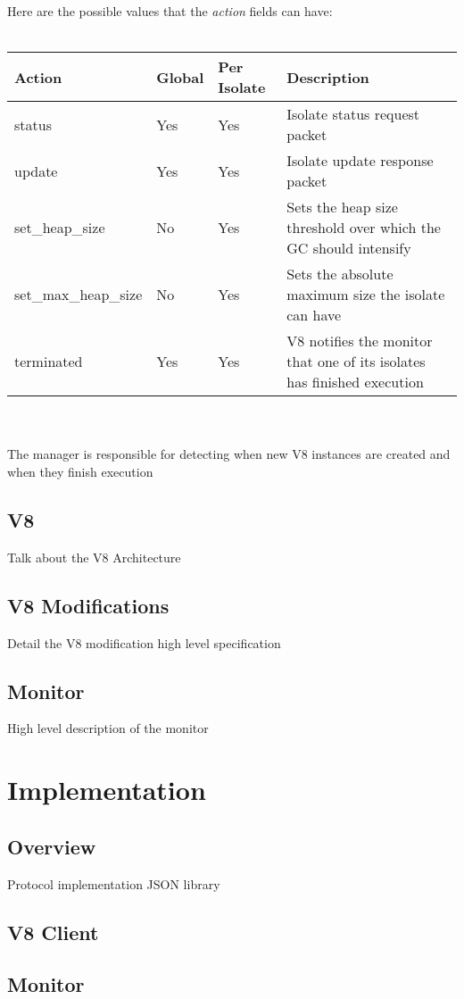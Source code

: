 \documentclass{l4proj}
\begin{document}
Here are the possible values that the \textit{action} fields can have:\\\\
\begin{tabular}{  l  l  l  l  }
  Action & Global & Per Isolate & Description \\
\hline
  status & Yes & Yes & Isolate status request packet\\
  update & Yes & Yes & Isolate update response packet\\
  set\_heap\_size & No & Yes & Sets the heap size threshold over which the GC should intensify\\
  set\_max\_heap\_size & No & Yes & Sets the absolute maximum size the isolate can have\\
  terminated & Yes & Yes & V8 notifies the monitor that one of its isolates has finished execution\\
\hline
\end{tabular}
\\\\
The manager is responsible for detecting when new V8 instances are created and when they finish execution
\subsection{V8}
Talk about the V8 Architecture
\subsection{V8 Modifications}
Detail the V8 modification high level specification
\subsection{Monitor}
High level description of the monitor

\section{Implementation}
\subsection{Overview}
Protocol implementation
JSON library
\subsection{V8 Client}
\subsection{Monitor}
\end{document}
